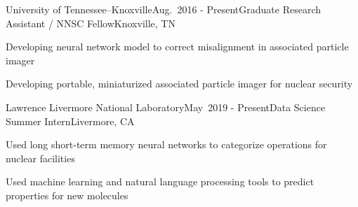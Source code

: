 
\begin{rSubsection}{University of Tennessee--Knoxville}{Aug.\ 2016 - Present}{Graduate Research Assistant / NNSC Fellow}{Knoxville, TN}
\item Developing neural network model to correct misalignment in associated particle imager
\item Developing portable, miniaturized associated particle imager for nuclear security
\end{rSubsection}


\begin{rSubsection}{Lawrence Livermore National Laboratory}{May\ 2019 - 
Present}{Data Science Summer Intern}{Livermore, CA}
\item Used long short-term memory neural networks to categorize operations for nuclear facilities
\item Used machine learning and natural language processing tools to predict  properties for new molecules
\end{rSubsection}



